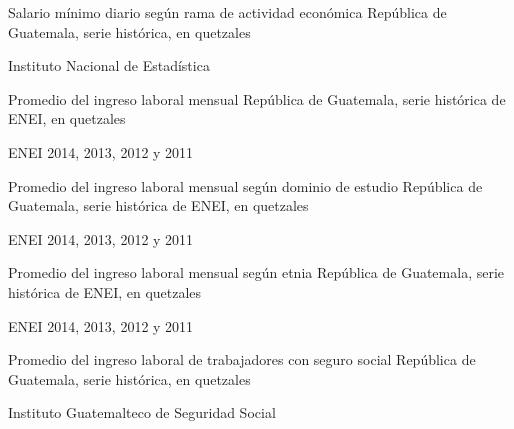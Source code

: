 
{%
 }%
{%
 Salario mínimo diario según rama de actividad económica} %
{%
 República de Guatemala, serie histórica, en quetzales } %
{%
 \begin{tikzpicture}[x=1pt,y=1pt]    \end{tikzpicture}}%
{%
 Instituto Nacional de Estadística} %



%
{%
}%
{%
	Promedio del ingreso laboral mensual} %
{%
	República de Guatemala, serie histórica de ENEI, en quetzales } %
{%
	\begin{tikzpicture}[x=1pt,y=1pt]    \end{tikzpicture}}%
{%
	ENEI 2014, 2013, 2012 y 2011} %



%
{%
}%
{%
	Promedio del ingreso laboral mensual según dominio de estudio} %
{%
	República de Guatemala, serie histórica de ENEI, en quetzales } %
{%
	\begin{tikzpicture}[x=1pt,y=1pt]    \end{tikzpicture}}%
{%
	ENEI 2014, 2013, 2012 y 2011} %


%
{%
}%
{%
	Promedio del ingreso laboral mensual según etnia} %
{%
	República de Guatemala, serie histórica de ENEI, en quetzales } %
{%
	\begin{tikzpicture}[x=1pt,y=1pt]    \end{tikzpicture}}%
{%
	ENEI 2014, 2013, 2012 y 2011} %



%
{%
}%
{%
	Promedio del ingreso laboral de trabajadores con seguro social } %
{%
	República de Guatemala, serie histórica, en quetzales } %
{%
	\begin{tikzpicture}[x=1pt,y=1pt]    \end{tikzpicture}}%
{%
	Instituto Guatemalteco de Seguridad Social} %


